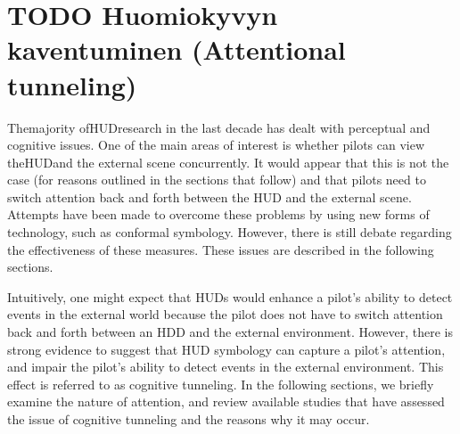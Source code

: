 \documentclass[utf8,bachelor,manualbib]{gradu3}
\begin{document}
\section{TODO Huomiokyvyn kaventuminen (Attentional tunneling)}

Themajority ofHUDresearch in the last decade has dealt with perceptual and cognitive
issues. One of the main areas of interest is whether pilots can view theHUDand
the external scene concurrently. It would appear that this is not the case (for reasons
outlined in the sections that follow) and that pilots need to switch attention back and
forth between the HUD and the external scene. Attempts have been made to overcome
these problems by using new forms of technology, such as conformal
symbology. However, there is still debate regarding the effectiveness of these measures.
These issues are described in the following sections.

Intuitively, one might expect that HUDs would enhance a pilot’s ability to detect
events in the external world because the pilot does not have to switch attention
back and forth between an HDD and the external environment. However, there
is strong evidence to suggest that HUD symbology can capture a pilot’s attention,
and impair the pilot’s ability to detect events in the external environment.
This effect is referred to as cognitive tunneling. In the following sections, we
briefly examine the nature of attention, and review available studies that have
assessed the issue of cognitive tunneling and the reasons why it may occur.
\end{document}
